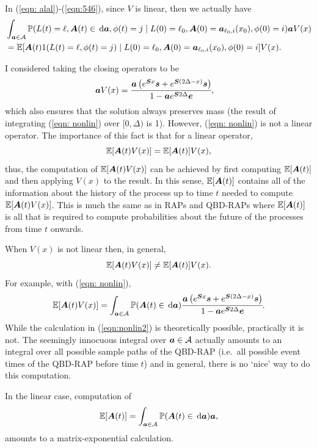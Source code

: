 In (\ref{eqn: alal})-(\ref{eqn:546}), since \(V\) is linear, then we actually have 
\begin{align}
	&\int_{\boldsymbol a \in\mathcal A}\mathbb P(L(t) = \ell, \boldsymbol A(t)\in\, \mathrm{d} \boldsymbol a,\phi(t) = j\mid L(0)=\ell_0, \boldsymbol A(0) = \boldsymbol a_{\ell_0,i}(x_0), \phi(0) = i) \boldsymbol a V(x)
	\\&= \mathbb E[\boldsymbol A(t)1(L(t)=\ell, \phi(t)=j) \mid L(0)=\ell_0, \boldsymbol A(0) = \boldsymbol a_{\ell_0,i}(x_0), \phi(0) = i]V(x).
\end{align}

\begin{rem}
	I considered taking the closing operators to be 
	\begin{align}
		\boldsymbol a V(x) &= \cfrac{\boldsymbol a \left(e^{ \boldsymbol{S}x} \boldsymbol s + e^{ \boldsymbol{S}(2\Delta-x)} \boldsymbol s\right)}{1-\boldsymbol a e^{\boldsymbol S 2\Delta}\boldsymbol e},\label{eqn: nonlin}
	\end{align}
	which also ensures that the solution always preserves mass (the result of integrating (\ref{eqn: nonlin}) over \([0,\Delta)\) is 1). However, (\ref{eqn: nonlin}) is not a linear operator. The importance of this fact is that for a linear operator, 
	\[\mathbb E[\boldsymbol A(t) V(x)] = \mathbb E[\boldsymbol A(t)]V(x),\]
	thus, the computation of \(\mathbb E[\boldsymbol A(t) V(x)]\) can be achieved by first computing \(\mathbb E[\boldsymbol A(t)]\) and then applying \(V(x)\) to the result. In this sense, \(\mathbb E[\boldsymbol A(t)]\) contains all of the information about the history of the process up to time \(t\) needed to compute \(\mathbb E[\boldsymbol A(t) V(x)]\). This is much the same as in RAPs and QBD-RAPs where \(\mathbb E[\boldsymbol A(t)]\) is all that is required to compute probabilities about the future of the processes from time \(t\) onwards. 

	When \(V(x)\) is not linear then, in general, 
	\[\mathbb E[\boldsymbol A(t) V(x)] \neq \mathbb E[\boldsymbol A(t)]V(x).\]
	For example, with (\ref{eqn: nonlin}), 
	\begin{align}
		\mathbb E[\boldsymbol A(t) V(x)] = \int_{\boldsymbol a \in\mathcal A} \mathbb P(\boldsymbol A(t) \in \, \mathrm{d} \boldsymbol a) \cfrac{\boldsymbol a \left(e^{ \boldsymbol{S}x} \boldsymbol s + e^{ \boldsymbol{S}(2\Delta-x)} \boldsymbol s\right)}{1-\boldsymbol a e^{\boldsymbol S 2\Delta}\boldsymbol e}.\label{eqn:nonlin2}
	\end{align}
	While the calculation in (\ref{eqn:nonlin2}) is theoretically possible, practically it is not. The seemingly innocuous integral over \(\boldsymbol a \in\mathcal A\) actually amounts to an integral over all possible sample paths of the QBD-RAP (i.e.~all possible event times of the QBD-RAP before time \(t\)) and in general, there is no `nice' way to do this computation. 
	
	In the linear case, computation of
	\[\mathbb E[\boldsymbol A(t)] = \int_{\boldsymbol a\in\mathcal A} \mathbb P(\boldsymbol A(t) \in \, \mathrm{d} \boldsymbol a) \boldsymbol a,\]
	amounts to a matrix-exponential calculation. 
\end{rem}

